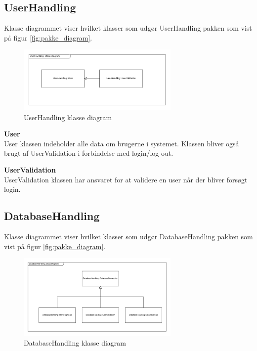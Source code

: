\newpage
\subsection{UserHandling}
Klasse diagrammet viser hvilket klasser som udgør UserHandling pakken som vist på figur \ref{fig:pakke_diagram}.

\vspace{-5pt}
\begin{figure}[H]
	\centering
	\includegraphics[width=0.7\textwidth]{Billeder/klasse_diagrammer/UserHandlingDiagram.png}
	\vspace{-5pt}
	\caption{UserHandling klasse diagram}
	\label{fig:UserHandling_klasse_diagram}
\end{figure}

\textbf{User}\\
User klassen indeholder alle data om brugerne i systemet. Klassen bliver også brugt af UserValidation i forbindelse med login/log out.

\textbf{UserValidation}\\
UserValidation klassen har ansvaret for at validere en user når der bliver forsøgt login.\\

\newpage
\subsection{DatabaseHandling}
Klasse diagrammet viser hvilket klasser som udgør DatabaseHandling pakken som vist på figur \ref{fig:pakke_diagram}.

\vspace{-5pt}
\begin{figure}[H]
	\centering
	\includegraphics[width=0.7\textwidth]{Billeder/klasse_diagrammer/DatabaseHandling.png}
	\vspace{-5pt}
	\caption{DatabaseHandling klasse diagram}
	\label{fig:DatabaseHandling_klasse_diagram}
\end{figure}

